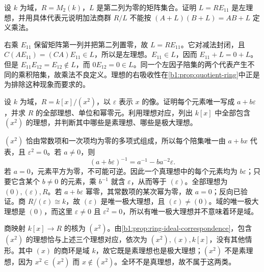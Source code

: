 \begin{exercise}\label{b1:ex:10-one-sided-quotient}
	设 \(k\) 为域，\(R=M_2(k)\)，\(L\) 是第二列为零的矩阵集合。证明 \(L=RE_{11}\) 是左理想，并用具体代表元说明加法商群 \(R/L\) 不能按 \((A+L)(B+L)=AB+L\) 定义乘法。
\end{exercise}
\begin{solution}
	右乘 \(E_{11}\) 保留矩阵第一列并把第二列置零，故 \(L=RE_{11}\)。它对减法封闭，且 \(C(AE_{11})=(CA)E_{11}\in L\)，所以是左理想。\(E_{11}\in L\)，因而 \(E_{11}+L=0+L\)。但是 \(E_{11}E_{12}=E_{12}\notin L\)，而 \(0E_{12}=0\in L\)。同一个左因子陪集的两个代表产生不同的乘积陪集，故乘法不良定义。理想的右吸收性在\cref{b1:prop:quotient-ring}中正是为排除这种现象而要求的。
\end{solution}

\begin{exercise}\label{b1:ex:10-dual-numbers}
	设 \(k\) 为域，\(R=k[x]/(x^2)\)，以 \(\varepsilon\) 表示 \(x\) 的像。证明每个元素唯一写成 \(a+b\varepsilon\)，并求 \(R\) 的全部理想、单位和幂零元。利用理想对应，列出 \(k[x]\) 中全部包含 \((x^2)\) 的理想，并判断其中哪些是素理想、哪些是极大理想。
\end{exercise}
\begin{solution}
	\((x^2)\) 恰由常数项和一次项均为零的多项式组成，所以每个陪集唯一由 \(a+bx\) 代表，且 \(\varepsilon^2=0\)。若 \(a\ne0\)，则
	\[
		(a+b\varepsilon)^{-1}=a^{-1}-ba^{-2}\varepsilon.
	\]
	若 \(a=0\)，元素平方为零，不可能可逆。因此一个真理想中的每个元素均为 \(b\varepsilon\)；只要它含某个 \(b\ne0\) 的元素，乘 \(b^{-1}\) 就含 \(\varepsilon\)，从而等于 \((\varepsilon)\)。全部理想为 \((0),(\varepsilon),R\)。若 \(a+b\varepsilon\) 幂零，其常数项的某次幂为零，故 \(a=0\)；反向已验证。商 \(R/(\varepsilon)\cong k\)，故 \((\varepsilon)\) 是唯一极大理想，且 \((\varepsilon)\ne(0)\)。域的唯一极大理想是 \((0)\)，而这里 \(\varepsilon\ne0\) 且 \(\varepsilon^2=0\)，所以有唯一极大理想并不意味着环是域。

	商映射 \(k[x]\to R\) 的核为 \((x^2)\)。由\cref{b1:prop:ring-ideal-correspondence}，包含 \((x^2)\) 的理想恰与上述三个理想对应，依次为 \((x^2),(x),k[x]\)，没有其他情形。其中 \((x)\) 的商环是域 \(k\)，故它既是素理想也是极大理想；\((x^2)\) 不是素理想，因为 \(x^2\in(x^2)\) 而 \(x\notin(x^2)\)。全环不是真理想，故不属于这两类。
\end{solution}

